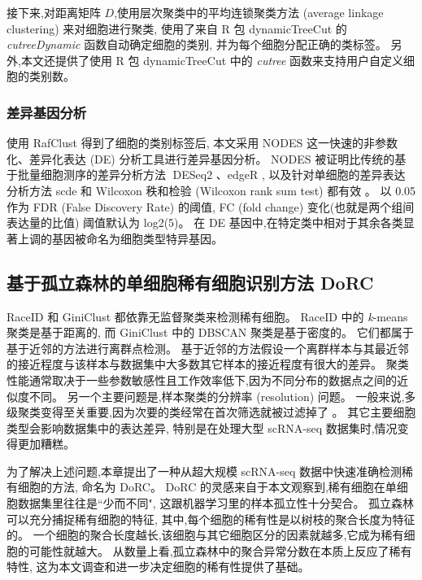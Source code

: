 接下来,对距离矩阵 $D$,使用层次聚类中的平均连锁聚类方法 (average linkage clustering) 来对细胞进行聚类,
使用了来自 R 包 dynamicTreeCut  的 \textit{cutreeDynamic} 函数自动确定细胞的类别,
并为每个细胞分配正确的类标签。
另外,本文还提供了使用 R 包 dynamicTreeCut 中的 \textit{cutree} 函数来支持用户自定义细胞的类别数。

\subsubsection{差异基因分析}
\label{subsec:de}

使用 RafClust 得到了细胞的类别标签后,
本文采用 NODES  这一快速的非参数化、差异化表达 (DE) 分析工具进行差异基因分析。
NODES 被证明比传统的基于批量细胞测序的差异分析方法 DESeq2 、edgeR ,
以及针对单细胞的差异表达分析方法 scde  和 Wilcoxon 秩和检验 (Wilcoxon rank sum test) 都有效 。
以 0.05 作为 FDR (False Discovery Rate) 的阈值, FC (fold change) 变化(也就是两个组间表达量的比值) 阈值默认为 log2(5)。
在 DE 基因中,在特定类中相对于其余各类显著上调的基因被命名为细胞类型特异基因。


\subsection{基于孤立森林的单细胞稀有细胞识别方法 DoRC}
\label{sec:method}

RaceID 和 GiniClust 都依靠无监督聚类来检测稀有细胞。
RaceID 中的 \textit{k}-means 聚类是基于距离的,
而 GiniClust 中的 DBSCAN 聚类是基于密度的。
它们都属于基于近邻的方法进行离群点检测。
基于近邻的方法假设一个离群样本与其最近邻的接近程度与该样本与数据集中大多数其它样本的接近程度有很大的差异。
聚类性能通常取决于一些参数敏感性且工作效率低下,因为不同分布的数据点之间的近似度不同。
另一个主要问题是,样本聚类的分辨率 (resolution) 问题。
一般来说,多级聚类变得至关重要,因为次要的类经常在首次筛选就被过滤掉了 。
其它主要细胞类型会影响数据集中的表达差异,
特别是在处理大型 scRNA-seq 数据集时,情况变得更加糟糕。

为了解决上述问题,本章提出了一种从超大规模 scRNA-seq 数据中快速准确检测稀有细胞的方法,
命名为 DoRC。
DoRC 的灵感来自于本文观察到,稀有细胞在单细胞数据集里往往是``少而不同", 这跟机器学习里的样本孤立性十分契合。
孤立森林可以充分捕捉稀有细胞的特征,
其中,每个细胞的稀有性是以树枝的聚合长度为特征的。
一个细胞的聚合长度越长,该细胞与其它细胞区分的因素就越多,它成为稀有细胞的可能性就越大。
从数量上看,孤立森林中的聚合异常分数在本质上反应了稀有特性,
这为本文调查和进一步决定细胞的稀有性提供了基础。

